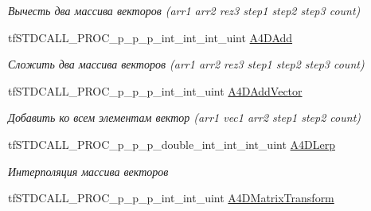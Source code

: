 \begin{DoxyCompactItemize}
\begin{DoxyCompactList}\small\item\em Вычесть два массива векторов (arr1 arr2 rez3 step1 step2 step3 count) \end{DoxyCompactList}\item 
\hypertarget{structs_functions_array_vector_c_p_u_aeddd4a7d793301fc0ccb00f661043d83}{tf\-S\-T\-D\-C\-A\-L\-L\-\_\-\-P\-R\-O\-C\-\_\-p\-\_\-p\-\_\-p\-\_\-int\-\_\-int\-\_\-int\-\_\-uint \hyperlink{structs_functions_array_vector_c_p_u_aeddd4a7d793301fc0ccb00f661043d83}{A4\-D\-Add}}\label{structs_functions_array_vector_c_p_u_aeddd4a7d793301fc0ccb00f661043d83}

\begin{DoxyCompactList}\small\item\em Сложить два массива векторов (arr1 arr2 rez3 step1 step2 step3 count) \end{DoxyCompactList}\item 
\hypertarget{structs_functions_array_vector_c_p_u_a777db612f72ff34197d205a41ee1fc31}{tf\-S\-T\-D\-C\-A\-L\-L\-\_\-\-P\-R\-O\-C\-\_\-p\-\_\-p\-\_\-p\-\_\-int\-\_\-int\-\_\-uint \hyperlink{structs_functions_array_vector_c_p_u_a777db612f72ff34197d205a41ee1fc31}{A4\-D\-Add\-Vector}}\label{structs_functions_array_vector_c_p_u_a777db612f72ff34197d205a41ee1fc31}

\begin{DoxyCompactList}\small\item\em Добавить ко всем элементам вектор (arr1 vec1 arr2 step1 step2 count) \end{DoxyCompactList}\item 
\hypertarget{structs_functions_array_vector_c_p_u_a6a5cdf7ad41e831e92768876eaea9085}{tf\-S\-T\-D\-C\-A\-L\-L\-\_\-\-P\-R\-O\-C\-\_\-p\-\_\-p\-\_\-p\-\_\-double\-\_\-int\-\_\-int\-\_\-int\-\_\-uint \hyperlink{structs_functions_array_vector_c_p_u_a6a5cdf7ad41e831e92768876eaea9085}{A4\-D\-Lerp}}\label{structs_functions_array_vector_c_p_u_a6a5cdf7ad41e831e92768876eaea9085}

\begin{DoxyCompactList}\small\item\em Интерполяция массива векторов \end{DoxyCompactList}\item 
\hypertarget{structs_functions_array_vector_c_p_u_a7aaa3667cbe30ff9217875a65e5ba81f}{tf\-S\-T\-D\-C\-A\-L\-L\-\_\-\-P\-R\-O\-C\-\_\-p\-\_\-p\-\_\-p\-\_\-int\-\_\-int\-\_\-uint \hyperlink{structs_functions_array_vector_c_p_u_a7aaa3667cbe30ff9217875a65e5ba81f}{A4\-D\-Matrix\-Transform}}\label{structs_functions_array_vector_c_p_u_a7aaa3667cbe30ff9217875a65e5ba81f}


\end{DoxyCompactItemize}
